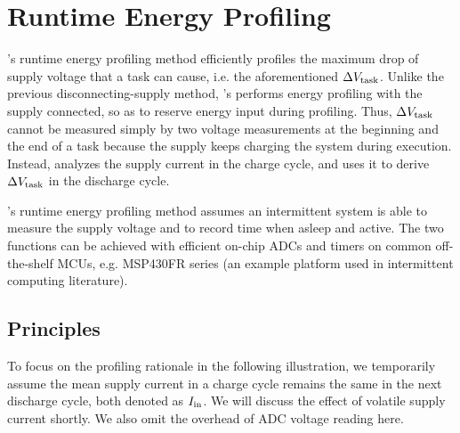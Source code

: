 \section{\nn{} Runtime Energy Profiling} \label{sec:method1}

\nn{}'s runtime energy profiling method efficiently profiles the maximum drop of supply voltage that a task can cause, i.e. the aforementioned $\Delta V_{\text{task}}$. 
Unlike the previous disconnecting-supply method, \nn{}'s performs energy profiling with the supply connected, so as to reserve energy input during profiling.
Thus, $\Delta V_{\text{task}}$ cannot be measured simply by two voltage measurements at the beginning and the end of a task because the supply keeps charging the system during execution. 
Instead, \nn{} analyzes the supply current in the charge cycle, and uses it to derive $\Delta V_{\text{task}}$ in the discharge cycle. 

\nn{}'s runtime energy profiling method assumes an intermittent system is able to measure the supply voltage and to record time when asleep and active. 
The two functions can be achieved with efficient on-chip ADCs and timers on common off-the-shelf MCUs, e.g. MSP430FR series (an example platform used in intermittent computing literature). 



\subsection{Principles}

To focus on the profiling rationale in the following illustration, we temporarily assume the mean supply current in a charge cycle remains the same in the next discharge cycle, both denoted as $I_{\text{in}}$. 
We will discuss the effect of volatile supply current shortly. 
We also omit the overhead of ADC voltage reading here. 

